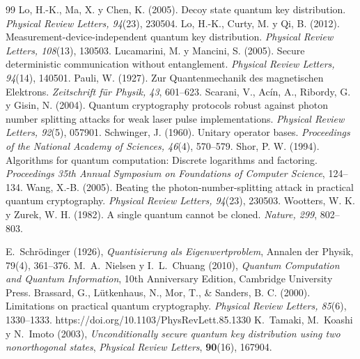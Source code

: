 \begin{thebibliography}{99}
 Lo, H.-K., Ma, X. y Chen, K. (2005). Decoy state quantum key distribution. \emph{Physical Review Letters, 94}(23), 230504.
 Lo, H.-K., Curty, M. y Qi, B. (2012). Measurement-device-independent quantum key distribution. \emph{Physical Review Letters, 108}(13), 130503.
 Lucamarini, M. y Mancini, S. (2005). Secure deterministic communication without entanglement. \emph{Physical Review Letters, 94}(14), 140501.
 Pauli, W. (1927). Zur Quantenmechanik des magnetischen Elektrons. \emph{Zeitschrift f\"ur Physik, 43}, 601--623.
 Scarani, V., Acín, A., Ribordy, G. y Gisin, N. (2004). Quantum cryptography protocols robust against photon number splitting attacks for weak laser pulse implementations. \emph{Physical Review Letters, 92}(5), 057901.
 Schwinger, J. (1960). Unitary operator bases. \emph{Proceedings of the National Academy of Sciences, 46}(4), 570--579.
 Shor, P. W. (1994). Algorithms for quantum computation: Discrete logarithms and factoring. \emph{Proceedings 35th Annual Symposium on Foundations of Computer Science}, 124--134.
 Wang, X.-B. (2005). Beating the photon-number-splitting attack in practical quantum cryptography. \emph{Physical Review Letters, 94}(23), 230503.
 Wootters, W. K. y Zurek, W. H. (1982). A single quantum cannot be cloned. \emph{Nature, 299}, 802--803.

 E.~Schrödinger (1926),
\textit{Quantisierung als Eigenwertproblem}, Annalen der Physik, 79(4), 361--376.
 M.~A.~Nielsen y I.~L.~Chuang (2010), \textit{Quantum Computation and Quantum Information}, 10th Anniversary Edition, Cambridge University Press.
Brassard, G., Lütkenhaus, N., Mor, T., \& Sanders, B. C. (2000). Limitations on practical quantum cryptography. \emph{Physical Review Letters, 85}(6), 1330--1333. https://doi.org/10.1103/PhysRevLett.85.1330
 K.~Tamaki, M.~Koashi y N.~Imoto (2003), \textit{Unconditionally secure quantum key distribution using two nonorthogonal states}, \textit{Physical Review Letters}, \textbf{90}(16), 167904.
\end{thebibliography}

